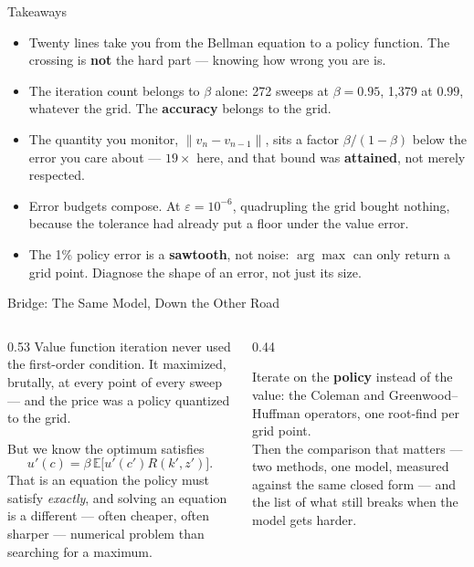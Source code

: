 \begin{frame}{Takeaways}
\begin{takeawaybox}
\begin{itemize}\small
  \item Twenty lines take you from the Bellman equation to a policy function. The crossing is \textbf{not} the hard part --- knowing how wrong you are is.
  \item The iteration count belongs to $\beta$ alone: 272 sweeps at $\beta=0.95$, 1{,}379 at $0.99$, whatever the grid. The \textbf{accuracy} belongs to the grid.
  \item The quantity you monitor, $\lVert v_n-v_{n-1}\rVert$, sits a factor $\beta/(1-\beta)$ below the error you care about --- $19\times$ here, and that bound was \textbf{attained}, not merely respected.
  \item Error budgets compose. At $\varepsilon=10^{-6}$, quadrupling the grid bought nothing, because the tolerance had already put a floor under the value error.
  \item The 1\% policy error is a \textbf{sawtooth}, not noise: $\arg\max$ can only return a grid point. Diagnose the shape of an error, not just its size.
\end{itemize}
\end{takeawaybox}
\end{frame}

\begin{frame}{Bridge: The Same Model, Down the Other Road}
\begin{columns}[T]
\begin{column}{0.53\textwidth}
\small
Value function iteration never used the first-order condition. It maximized, brutally, at every point of every sweep --- and the price was a policy quantized to the grid.
\medskip

But we know the optimum satisfies
\[
  u'(c)=\beta\,\mathbb{E}\big[u'(c')R(k',z')\big].
\]
That is an equation the policy must satisfy \emph{exactly}, and solving an equation is a different --- often cheaper, often sharper --- numerical problem than searching for a maximum.
\end{column}
\begin{column}{0.44\textwidth}
\begin{conceptbox}[title=\textbf{Next (3.A3)}]\small
Iterate on the \textbf{policy} instead of the value: the Coleman and Greenwood--Huffman operators, one root-find per grid point.\\[1mm]
Then the comparison that matters --- two methods, one model, measured against the same closed form --- and the list of what still breaks when the model gets harder.
\end{conceptbox}
\end{column}
\end{columns}
\end{frame}


